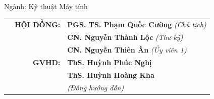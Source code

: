 \begin{titlepage}
\begin{center}
        \vspace{1em}
        
        {\fontsize{15pt}{18pt}\selectfont Ngành: Kỹ thuật Máy tính}

        \vspace{1cm}

        \begin{table}[h]
            \centering
            \fontsize{15pt}{18pt}\selectfont
            \begin{tabular}{p{3.5cm} r l}
                & \textbf{HỘI ĐỒNG:} & \textbf{PGS. TS. Phạm Quốc Cường} \textit{(Chủ tịch)} \\
                & & \textbf{CN. Nguyễn Thành Lộc} \textit{(Thư ký)} \\
                & & \textbf{CN. Nguyễn Thiên Ân} \textit{(Ủy viên 1)} \\
                & \textbf{GVHD:} & \textbf{ThS. Huỳnh Phúc Nghị} \\
                & & \textbf{ThS. Huỳnh Hoàng Kha} \\
                & & \textit{(Đồng hướng dẫn)} \\

\end{tabular}
\end{table}
\end{center}
\end{titlepage}

